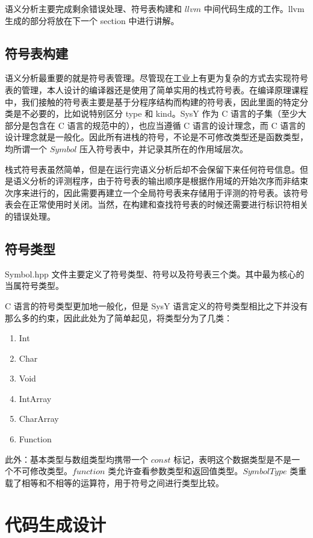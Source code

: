 \documentclass[a4paper]{article}
\begin{document}
		语义分析主要完成剩余错误处理、符号表构建和 $llvm$ 中间代码生成的工作。llvm 生成的部分将放在下一个 section 中进行讲解。
		
		\subsection{符号表构建}
		
			语义分析最重要的就是符号表管理。尽管现在工业上有更为复杂的方式去实现符号表的管理，本人设计的编译器还是使用了简单实用的栈式符号表。在编译原理课程中，我们接触的符号表主要是基于分程序结构而构建的符号表，因此里面的特定分类是不必要的，比如说特别区分 type 和 kind。SysY 作为 C 语言的子集（至少大部分是包含在 C 语言的规范中的），也应当遵循 C 语言的设计理念，而 C 语言的设计理念就是一般化。因此所有进栈的符号，不论是不可修改类型还是函数类型，均所谓一个 $Symbol$ 压入符号表中，并记录其所在的作用域层次。
			
			栈式符号表虽然简单，但是在运行完语义分析后却不会保留下来任何符号信息。但是语义分析的评测程序，由于符号表的输出顺序是根据作用域的开始次序而非结束次序来进行的，因此需要再建立一个全局符号表来存储用于评测的符号表。该符号表会在正常使用时关闭。当然，在构建和查找符号表的时候还需要进行标识符相关的错误处理。
			
		\subsection{符号类型}
		
			Symbol.hpp 文件主要定义了符号类型、符号以及符号表三个类。其中最为核心的当属符号类型。
			
			C 语言的符号类型更加地一般化，但是 SysY 语言定义的符号类型相比之下并没有那么多的约束，因此此处为了简单起见，将类型分为了几类：
			
			\begin{enumerate}
				\item Int
				\item Char
				\item Void
				\item IntArray
				\item CharArray
				\item Function
			\end{enumerate}
			
			此外：基本类型与数组类型均携带一个 $const$ 标记，表明这个数据类型是不是一个不可修改类型。$function$ 类允许查看参数类型和返回值类型。$SymbolType$ 类重载了相等和不相等的运算符，用于符号之间进行类型比较。
		
	\section{代码生成设计}
	
\end{document}
